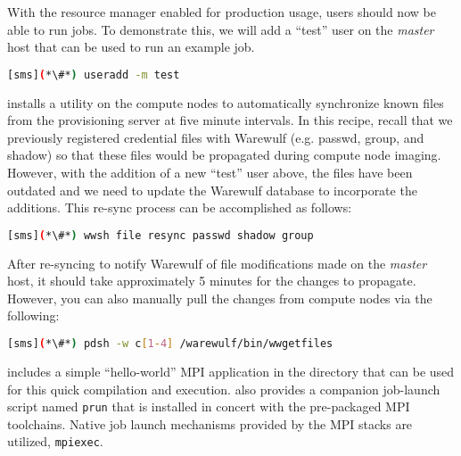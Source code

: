 With the resource manager enabled for production usage, users should now be
able to run jobs. To demonstrate this, we will add a ``test'' user on the {\em master}
host that can be used to run an example job.

\begin{lstlisting}[language=bash,keywords={}]
[sms](*\#*) useradd -m test
\end{lstlisting}

\Warewulf{} installs a utility on the compute nodes to automatically 
synchronize known files from the provisioning server at five minute intervals. In this
recipe, recall that we previously registered credential files with Warewulf (e.g. passwd,
group, and shadow) so that these files would be propagated during compute node
imaging. However, with the addition of a new ``test'' user above, the files
have been outdated and we need to update the Warewulf database to incorporate
the additions. This re-sync process can be accomplished as follows:

\begin{lstlisting}[language=bash,keywords={}]
[sms](*\#*) wwsh file resync passwd shadow group
\end{lstlisting}


\begin{center}
\begin{tcolorbox}[]
\small
After re-syncing to notify Warewulf of file modifications made on the {\em
master} host, it should take approximately 5 minutes for the changes to
propagate. However, you can also manually pull the changes from compute nodes
via the following:
\begin{lstlisting}[language=bash,keywords={}]
[sms](*\#*) pdsh -w c[1-4] /warewulf/bin/wwgetfiles 
\end{lstlisting}
\end{tcolorbox}
\end{center}


\OHPC{} includes a simple ``hello-world'' MPI application in the
 directory that can be used for this quick
compilation and execution. \OHPC{} also provides a companion job-launch script
named \texttt{prun} that is installed in concert with the pre-packaged MPI
toolchains. Native job launch mechanisms provided by the MPI stacks are 
utilized, \texttt{mpiexec}.

